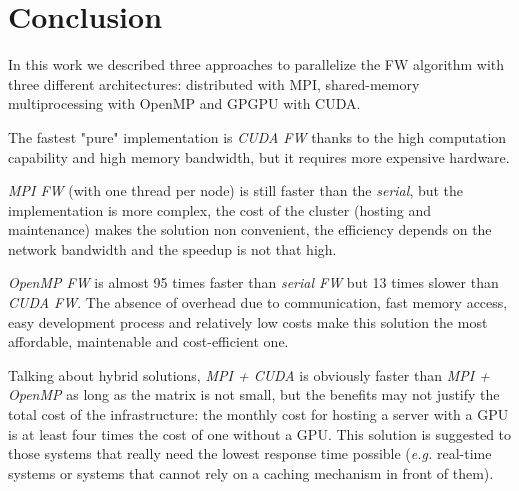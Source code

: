 \section*{Conclusion}

In this work we described three approaches to parallelize the FW algorithm with three different architectures:
distributed with MPI, shared-memory multiprocessing with OpenMP and GPGPU with CUDA.

The fastest "pure" implementation is \emph{CUDA FW} thanks to the high computation capability and high memory bandwidth, 
but it requires more expensive hardware. 

\emph{MPI FW} (with one thread per node)  is still faster than the \emph{serial}, but the implementation
is more complex, the cost of the cluster (hosting and maintenance) makes the solution non convenient,
the efficiency depends on the network bandwidth and the speedup is not that high.

\emph{OpenMP FW} is almost 95 times faster than \emph{serial FW} but 13 times slower than \emph{CUDA FW}. The absence of
overhead due to communication, fast memory access, easy development process and relatively low costs make this solution the
most affordable, maintenable and cost-efficient one.

Talking about hybrid solutions, \emph{MPI + CUDA} is obviously faster than \emph{MPI + OpenMP} as long as the matrix is not small, 
but the benefits may not justify the total cost of the infrastructure: the monthly cost for hosting a server with a GPU is at least
four times the cost of one without a GPU. This solution is suggested to those systems that really need the lowest response time possible
(\emph{e.g.} real-time systems or systems that cannot rely on a caching mechanism in front of them).